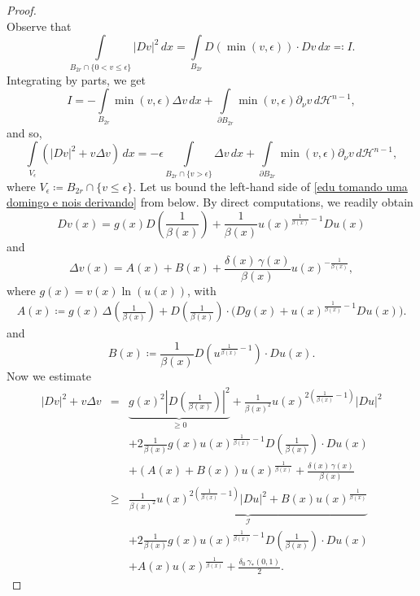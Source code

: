 \documentclass[reqno,11pt]{amsart}
\newcommand{\1}{\mathds{1}}
\numberwithin{equation}{section}
\begin{document}
\begin{proof}
$$$$
Observe that
$$
    \int\limits_{B_{2r} \cap \{0 < v \leq \epsilon \}} |Dv|^2\,dx  = \int\limits_{B_{2r}} D(\min(v,\epsilon)) \cdot Dv\,dx \eqqcolon I.
$$
Integrating by parts, we get
$$
    I = - \int\limits_{B_{2r}} \min(v,\epsilon) \Delta v\,dx + \int\limits_{\partial B_{2r}} \min(v,\epsilon) \partial_\nu v\,d\mathcal{H}^{n-1} ,
$$
and so,
\begin{equation}\label{edu tomando uma domingo e nois derivando}
     \int\limits_{V_\epsilon} \left(|Dv|^2 + v\Delta v\right)\,dx = - \epsilon \int\limits_{B_{2r} \cap \{v > \epsilon \}}\Delta v\,dx + \int\limits_{\partial B_{2r}} \min(v,\epsilon) \partial_\nu v\,d\mathcal{H}^{n-1},
\end{equation}
where $V_\epsilon \coloneqq B_{2r} \cap \{v \leq \epsilon \}$. Let us bound the left-hand side of \eqref{edu tomando uma domingo e nois derivando} from below. By direct computations, we readily obtain
$$
    Dv(x)  =   g(x)D \left(\frac{1}{\beta(x)} \right) + \frac{1}{\beta(x)}u(x)^{\frac{1}{\beta(x)} - 1}Du(x)
$$
and
$$
    \Delta v(x)  =  A(x) + B(x) + \frac{\delta(x)\, \gamma(x)}{\beta(x)} u(x)^{-\frac{1}{\beta(x)}},
$$
where $g(x) = v(x) \ln(u(x))$, with 
\begin{eqnarray*}
A(x) \coloneqq g(x)\,\Delta\!\left(\tfrac{1}{\beta(x)}\right)
+ D\!\left(\tfrac{1}{\beta(x)}\right)\!\cdot\Big(Dg(x)+u(x)^{\frac{1}{\beta(x)}-1}Du(x)\Big).
\end{eqnarray*}
and
$$
    B(x) \coloneqq \frac{1}{\beta(x)} D\left(u^{\frac{1}{\beta(x)}-1}\right) \cdot Du(x).
$$
Now we estimate
\begin{eqnarray*}
|Dv|^2 + v \Delta v & = & \displaystyle \underbrace{g(x)^2\left|D\left(\frac{1}{\beta(x)}\right)\right|^2}_{\geq 0} + \frac{1}{\beta(x)^2}u(x)^{2\left(\frac{1}{\beta(x)}-1\right)}|Du|^2 \\
         & & +    2\frac{1}{\beta(x)}g(x)u(x)^{\frac{1}{\beta(x)} - 1}D\left(\frac{1}{\beta(x)}\right) \cdot Du(x)\\
         & & +  (A(x) + B(x))u(x)^{\frac{1}{\beta(x)}} + \frac{\delta(x)\, \gamma(x)}{\beta(x)}\\
         & \geq & \underbrace{\frac{1}{\beta(x)^2}u(x)^{2\left(\frac{1}{\beta(x)}-1\right)}|Du|^2 +  B(x) u(x)^{\frac{1}{\beta(x)}}}_{\mathcal{I}}\\
         & & +   2\frac{1}{\beta(x)}g(x)u(x)^{\frac{1}{\beta(x)} - 1}D\left(\frac{1}{\beta(x)}\right) \cdot Du(x)\\
         & & +   A(x)u(x)^{\frac{1}{\beta(x)}} + \frac{\delta_0 \, \gamma_\ast (0,1)}{2}.
\end{eqnarray*}

\end{proof}
\end{document}
